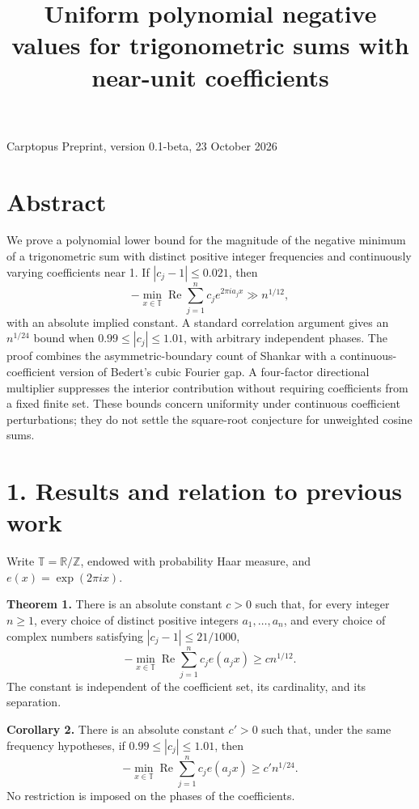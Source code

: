 \documentclass[11pt]{article}
\begin{document}
\title{Uniform polynomial negative values for trigonometric sums with near-unit coefficients}\author{}\date{}\maketitle

Carptopus  
Preprint, version 0.1-beta, 23 October 2026

\section*{Abstract}

We prove a polynomial lower bound for the magnitude of the negative minimum of a trigonometric sum with distinct positive integer frequencies and continuously varying coefficients near 1. If \(|c_j-1|\leq 0.021\), then
\[
-\min_{x\in\mathbb T}\operatorname{Re}\sum_{j=1}^n c_j e^{2\pi i a_jx}\gg n^{1/12},
\]
with an absolute implied constant. A standard correlation argument gives an \(n^{1/24}\) bound when \(0.99\leq |c_j|\leq1.01\), with arbitrary independent phases. The proof combines the asymmetric-boundary count of Shankar with a continuous-coefficient version of Bedert's cubic Fourier gap. A four-factor directional multiplier suppresses the interior contribution without requiring coefficients from a fixed finite set. These bounds concern uniformity under continuous coefficient perturbations; they do not settle the square-root conjecture for unweighted cosine sums.

\section*{1. Results and relation to previous work}

Write \(\mathbb T=\mathbb R/\mathbb Z\), endowed with probability Haar measure, and \(e(x)=\exp(2\pi i x)\).

\textbf{Theorem 1.} There is an absolute constant \(c>0\) such that, for every integer \(n\geq1\), every choice of distinct positive integers \(a_1,\ldots,a_n\), and every choice of complex numbers satisfying \(|c_j-1|\leq21/1000\),
\[
-\min_{x\in\mathbb T}\operatorname{Re}\sum_{j=1}^n c_j e(a_jx)\geq c n^{1/12}.
\]
The constant is independent of the coefficient set, its cardinality, and its separation.

\textbf{Corollary 2.} There is an absolute constant \(c'>0\) such that, under the same frequency hypotheses, if \(0.99\leq |c_j|\leq1.01\), then
\[
-\min_{x\in\mathbb T}\operatorname{Re}\sum_{j=1}^n c_j e(a_jx)\geq c'n^{1/24}.
\]
No restriction is imposed on the phases of the coefficients.
\end{document}
